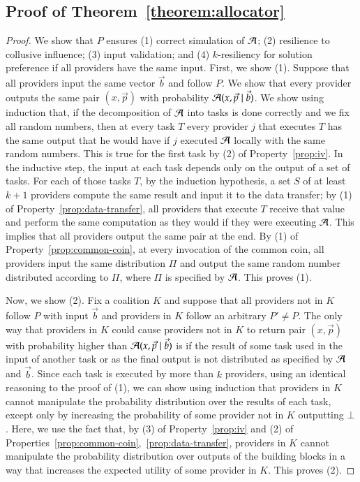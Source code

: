 \subsection{Proof of Theorem~\ref{theorem:allocator}}
\label{app:allocator}

\begin{proof}
We show that $P$ ensures (1) correct simulation of $\mathcal{A}$; (2) resilience to collusive influence;
(3) input validation; and (4) $k$-resiliency for solution preference if all providers have the same input.
First, we show (1). Suppose that all providers input the same vector $\vec{b}$
and follow $P$. We show that every provider outputs the same pair $(x,\vec{p})$
with probability $\mathcal{A}(x,\vec{p} \mid \vec{b})$. We show using induction that,
if the decomposition of $\mathcal{A}$ into tasks is done correctly and we fix all random
numbers, then at every task $T$ every provider $j$ that executes $T$ has the same output
that he would have if $j$ executed $\mathcal{A}$ locally with the same random numbers.
This is true for the first task by (2) of Property~\ref{prop:iv}. In the inductive step,
the input at each task depends only on the output of a set of tasks.
For each of those tasks $T$, by the induction hypothesis,
a set $S$ of at least $k+1$ providers compute the 
same result and input it to the data transfer;
by (1) of Property~\ref{prop:data-transfer}, all providers that execute $T$
receive that value and perform the same computation as they would if they were executing $\mathcal{A}$.
This implies that all providers output the same pair at the end.
By (1) of Property~\ref{prop:common-coin}, at every invocation
of the common coin, all providers input the same distribution $\Pi$ and output the same random number
distributed according to $\Pi$, where $\Pi$ is specified by $\mathcal{A}$. This proves (1).

Now, we show (2). Fix a coalition $K$ and suppose that all providers 
not in $K$ follow $P$ with input $\vec{b}$ and providers in $K$ follow an arbitrary $P' \ne P$.
The only way that providers in $K$ could cause providers not in $K$
to return pair $(x,\vec{p})$ with probability higher than $\mathcal{A}(x,\vec{p} \mid \vec{b})$
is if the result of some task used in the input of another task or as the final output
is not distributed as specified by $\mathcal{A}$ and $\vec{b}$.
Since each task is executed by more than $k$ providers, 
using an identical reasoning to the proof of (1), we can show using induction
that providers in $K$ cannot manipulate the probability distribution over the results
of each task, except only by increasing the probability of some provider 
not in $K$ outputting $\bot$. Here, we use the fact that,
by (3) of Property~\ref{prop:iv} and
(2) of Properties~\ref{prop:common-coin},~\ref{prop:data-transfer},
providers in $K$ cannot manipulate the probability distribution over
outputs of the building blocks in a way that increases
the expected utility of some provider in $K$. This proves (2).


\end{proof}
